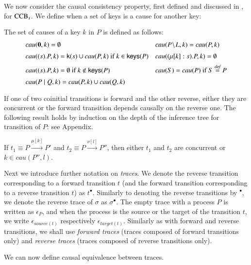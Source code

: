 We now consider the causal consistency property, first defined and discussed in 
\cite{danos2004ccsr,LaneseMS10}, for ${\rm CCB}_s$. We define when
a set of keys is a cause for another key:
\renewcommand{\arraystretch}{1}
\begin{definition}\label{def:causalkeys} \normalfont The set of causes of a key $k$ in $P$ 
	is defined as follows:
$$\begin{array}{ll}
cau(\mathbf{0},k)=\emptyset & cau(P \!\setminus\!L,k)=cau(P,k) \\ [5pt]
cau((s).P,k)=\mathsf{k}(s) \cup cau(P,k) \mbox{ if }k\in \mathsf{keys}(P) &  cau((\mu[k]:s).P,k)=\emptyset \\ [5pt]
cau((s).P,k)=\emptyset \mbox{ if }k\notin \mathsf{keys}(P) &  cau(S) = cau(P) \mbox{ if }S \stackrel{\emph{def}}{=} P \\ [5pt]
cau(P \; \vert \; Q,k)=cau(P,k) \cup cau(Q,k)
\end{array}$$
\end{definition}
If one of two coinitial transitions is forward and the other reverse, either they are concurrent or
the forward transition depends causally on the reverse one. 
The following result holds by induction on the depth of the inference tree for transition of $P$:
see Appendix.

\begin{proposition}\label{prop:conflict} 
If $t_1 \equiv P \xrightarrow{\underline{\mu}[k]} P'$ and $t_2 \equiv P \xrightarrow{\nu[l]} P''$, 
then either $t_1$ and $t_2$ are concurrent or $k \in cau(P'',l)$.
\end{proposition}
%
Next we introduce further notation on \emph{traces}. 
We denote the reverse transition corresponding 
to a forward transition $t$ (and the forward transition corresponding to a reverse transition $t$)
as $t^\bullet$. Similarly to denoting the reverse transitions by $^\bullet$, we denote the reverse trace of 
$\sigma$ as $\sigma^\bullet$.
The empty trace with a process $P$ is written as $\epsilon_P$, and when the process is the source or 
the target of the transition $t$, we write $\epsilon_{source(t)}$ respectively $\epsilon_{target(t)}$.
Similarly as with forward and reverse transitions, we shall use \emph{forward traces} (traces composed of 
forward transitions only) and \emph{reverse traces} (traces composed of reverse transitions only).


We can now define causal equivalence 
between traces. 

